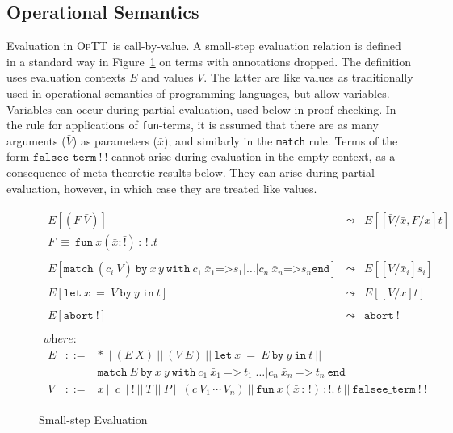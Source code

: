 \documentclass{fundam}
\newcommand{\optt}{\textsc{OpTT}}
\newcommand{\bang}[0]{\texttt{!}}
\begin{document}
\subsection{Operational Semantics}
\label{sec:opsem}

Evaluation in \optt\ is call-by-value.  A small-step evaluation
relation is defined in a standard way in Figure~\ref{fig:eval} on
terms with annotations dropped.  The definition uses evaluation
contexts $E$ and values $V$.  The latter are like values as
traditionally used in operational semantics of programming languages,
but allow variables.  Variables can occur during partial evaluation,
used below in proof checking.  In the rule for applications of
\texttt{fun}-terms, it is assumed that there are as many arguments
($\bar{V}$) as parameters ($\bar{x}$); and similarly in the
\texttt{match} rule.  Terms of the form $\texttt{falsee\_term}\ \bang\ \bang$
cannot arise during evaluation in the empty context, as a consequence
of meta-theoretic results below.  They can arise during partial
evaluation, however, in which case they are treated like values.

\begin{figure}
\[
\begin{array}{l}
\begin{array}{lll}
E[(F\ \bar{V})] & \leadsto &
E[[\bar{V}/\bar{x},F/x]t] \\ 
F \ \equiv\ \texttt{fun}\ x(\bar{x}:\bar{\bang})\,:\,\bang\,.t &\ & \ 
\\ \\
E[ \texttt{match}\ (c_i\ \bar{V})\  \texttt{by}\ x\,y\ \texttt{with}
\ c_1\ \bar{x}_1 \texttt{=>} s_1 | \ldots 
        | c_n\ \bar{x}_n \texttt{=>} s_n \texttt{end}] 
& \leadsto &
E[[\bar{V}/\bar{x}_i]s_i]  \\ \\
E[\texttt{let}\ x\ =\ V\ \texttt{by}\ y\ \texttt{in}\ t] & \leadsto &  
E[[V/x]t] \\ \\
E[\texttt{abort}\ \bang] & \leadsto & \texttt{abort}\ \bang 
\end{array} \\ \\ 
\textit{where:}\\ 
\begin{array}{lll}
E & ::= & *\ ||\ (E\ X)\ ||\ (V\ E)\ ||\  
\texttt{let}\ x\ =\ E\ \texttt{by}\ y \ \texttt{in}\ t\ 
||\\
\ &\ & \texttt{match}\ E\ \texttt{by}\ x\ y \ \texttt{with}\ c_1\ \bar{x}_1\ \texttt{=>}\ t_1 |
 \ldots | c_n\ \bar{x}_n\ \texttt{=>}\ t_n\ \texttt{end} \\ 
V & ::= & x\ ||\ c\ ||\ \bang\ ||\ T\ ||\ P\ ||\ (c\ V_1\,\cdots\, V_n)\ ||\ \texttt{fun}\ x(\bar{x}\,:\,\bang)\,:\bang .\ t\ ||\ \texttt{falsee\_term}\ \bang\ \bang
\end{array}
\end{array}
\]
\caption{\label{fig:eval}Small-step Evaluation}
\end{figure}
\end{document}
